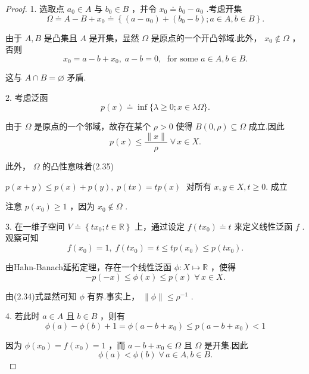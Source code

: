 \begin{proof}
1. 选取点 ${a}_{0} \in  A$ 与 ${b}_{0} \in  B$ ，并令 ${x}_{0} \doteq  {b}_{0} - {a}_{0}$ .考虑开集
\[
\Omega  \doteq  A - B + {x}_{0} \doteq  \left\{  {\left( {a - {a}_{0}}\right)  + \left( {{b}_{0} - b}\right) ;a \in  A,b \in  B}\right\}  .
\]

由于 $A,B$ 是凸集且 $A$ 是开集，显然 $\Omega$ 是原点的一个开凸邻域.此外， ${x}_{0} \notin  \Omega$ ，否则
\[
{x}_{0} = a - b + {x}_{0},\;a - b = 0,\;\text{ for some }a \in  A,b \in  B.
\]

这与 $A \cap  B = \varnothing$ 矛盾.

2. 考虑泛函
\begin{equation}\tag{2.33}
p\left( x\right)  \doteq  \inf \{ \lambda  \geq  0;x \in  {\lambda \Omega }\} .
\end{equation}

由于 $\Omega$ 是原点的一个邻域，故存在某个 $\rho  > 0$ 使得 $B\left( {0,\rho }\right)  \subseteq  \Omega$ 成立.因此
\begin{equation}\tag{2.34}
p\left( x\right)  \leq  \frac{\| x\| }{\rho }\;\forall\,x \in  X.
\end{equation}

此外， $\Omega$ 的凸性意味着(2.35)

$p\left( {x + y}\right)  \leq  p\left( x\right)  + p\left( y\right) ,\;p\left( {tx}\right)  = {tp}\left( x\right) \;$ 对所有 $x,y \in  X,t \geq  0.$ 成立

注意 $p\left( {x}_{0}\right)  \geq  1$ ，因为 ${x}_{0} \notin  \Omega$ .

3. 在一维子空间 $V \doteq  \left\{  {t{x}_{0};t \in  \mathbb{R}}\right\}$ 上，通过设定 $f\left( {t{x}_{0}}\right)  \doteq  t$ 来定义线性泛函 $f$ .观察可知
\[
f\left( {x}_{0}\right)  = 1,\;f\left( {t{x}_{0}}\right)  = t \leq  {tp}\left( {x}_{0}\right)  \leq  p\left( {t{x}_{0}}\right) .
\]

由Hahn-Banach延拓定理，存在一个线性泛函 $\phi  : X \mapsto  \mathbb{R}$ ，使得
\[
- p\left( {-x}\right)  \leq  \phi \left( x\right)  \leq  p\left( x\right) \;\forall\,x \in  X.
\]

由(2.34)式显然可知 $\phi$ 有界.事实上， $\| \phi \|  \leq  {\rho }^{-1}$ .

4. 若此时 $a \in  A$ 且 $b \in  B$ ，则有
\[
\phi \left( a\right)  - \phi \left( b\right)  + 1 = \phi \left( {a - b + {x}_{0}}\right)  \leq  p\left( {a - b + {x}_{0}}\right)  < 1
\]

因为 $\phi \left( {x}_{0}\right)  = f\left( {x}_{0}\right)  = 1$ ，而 $a - b + {x}_{0} \in  \Omega$ 且 $\Omega$ 是开集.因此
\[
\phi \left( a\right)  < \phi \left( b\right) \;\forall\,a \in  A,b \in  B.
\]


\end{proof}
